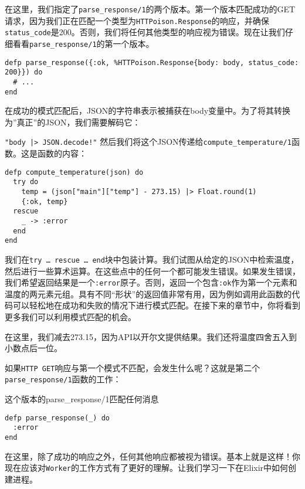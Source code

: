 在这里，我们指定了\texttt{parse\_response/1}的两个版本。第一个版本匹配成功的GET请求，因为我们正在匹配一个类型为\texttt{HTTPoison.Response}的响应，并确保\texttt{status\_code}是200。否则，我们将任何其他类型的响应视为错误。现在让我们仔细看看\texttt{parse\_response/1}的第一个版本。

\begin{code}{}
\begin{verbatim}
defp parse_response({:ok, %HTTPoison.Response{body: body, status_code: 200}}) do
  # ...
end
\end{verbatim}
\end{code}

在成功的模式匹配后，JSON的字符串表示被捕获在body变量中。为了将其转换为''真正''的JSON，我们需要解码它：

\texttt{"body |> JSON.decode!"}
然后我们将这个JSON传递给\texttt{compute\_temperature/1}函数。这是函数的内容：

\begin{code}{}
\begin{verbatim}
defp compute_temperature(json) do
  try do
    temp = (json["main"]["temp"] - 273.15) |> Float.round(1)
    {:ok, temp}
  rescue
    _ -> :error
  end
end
\end{verbatim}
\end{code}

我们在\texttt{try … rescue … end}块中包装计算。我们试图从给定的JSON中检索温度，然后进行一些算术运算。在这些点中的任何一个都可能发生错误。如果发生错误，我们希望返回结果是一个\texttt{:error}原子。否则，返回一个包含\texttt{:ok}作为第一个元素和温度的两元素元组。具有不同``形状''的返回值非常有用，因为例如调用此函数的代码可以轻松地在成功和失败的情况下进行模式匹配。在接下来的章节中，你将看到更多我们可以利用模式匹配的机会。

在这里，我们减去273.15，因为API以开尔文提供结果。我们还将温度四舍五入到小数点后一位。

如果\texttt{HTTP GET}响应与第一个模式不匹配，会发生什么呢？这就是第二个\texttt{parse\_response/1}函数的工作：

\begin{code}{这个版本的parse\_response/1匹配任何消息}
\begin{verbatim}
defp parse_response(_) do
  :error
end
\end{verbatim}
\label{lst:parse_response_2}
\end{code}

在这里，除了成功的响应之外，任何其他响应都被视为错误。基本上就是这样！你现在应该对\texttt{Worker}的工作方式有了更好的理解。让我们学习一下在Elixir中如何创建进程。

